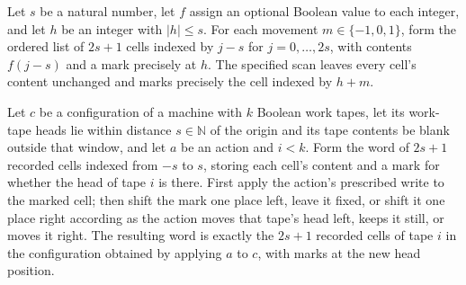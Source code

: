 \begin{theorem}
\label{Turing.recordStep_cell_shift}
\leanok
{}
Let $s$ be a natural number, let $f$ assign an optional Boolean value to each integer,
and let $h$ be an integer with $|h|\le s$. For each movement $m\in\{-1,0,1\}$, form the
ordered list of $2s+1$ cells indexed by $j-s$ for $j=0,\ldots,2s$, with contents
$f(j-s)$ and a mark precisely at $h$. The specified scan leaves every cell’s content
unchanged and marks precisely the cell indexed by $h+m$.
\end{theorem}

\begin{theorem}
\label{Turing.recordStep_tape_word}
\leanok
{}
Let $c$ be a configuration of a machine with $k$ Boolean work tapes, let its work-tape
heads lie within distance $s\in\mathbb{N}$ of the origin and its tape contents be blank
outside that window, and let $a$ be an action and $i<k$. Form the word of $2s+1$
recorded cells indexed from $-s$ to $s$, storing each cell's content and a mark for
whether the head of tape $i$ is there. First apply the action's prescribed write to the
marked cell; then shift the mark one place left, leave it fixed, or shift it one place
right according as the action moves that tape's head left, keeps it still, or moves it
right. The resulting word is exactly the $2s+1$ recorded cells of tape $i$ in the
configuration obtained by applying $a$ to $c$, with marks at the new head position.
\end{theorem}

